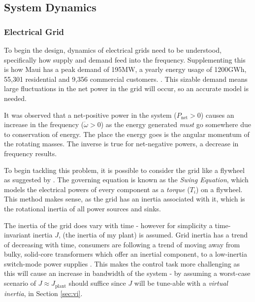 \subsection{System Dynamics}
\label{sec:sysdyn}
\subsubsection{Electrical Grid}

To begin the design, dynamics of electrical grids need to be understood, specifically how supply and demand feed into the frequency.
Supplementing this is how Maui has a {peak demand of 195MW, a yearly energy usage of 1200GWh}, 55,301 residential and 9,356 commercial customers. \cite{power:maui}.
This sizable demand means large fluctuations in the net power in the grid will occur, so an accurate model is needed.

It was observed that a net-positive power in the system ($P_{\text{net}} > 0$) causes an increase in the frequency ($\dot \omega > 0$) as the energy generated \emph{must} go somewhere due to conservation of energy.
The place the energy goes is the angular momentum of the rotating masses.
The inverse is true for net-negative powers, a decrease in frequency results.

To begin tackling this problem, it is possible to consider the grid like a flywheel as suggested by \cite{power:swing}.
The governing equation is known as the \emph{Swing Equation}, which models the electrical powers of every component as a \emph{torque} ($T_i$) on a flywheel.
This method makes sense, as the grid has an inertia associated with it, which is the rotational inertia of all power sources and sinks.

The inertia of the grid does vary with time - however for simplicity a time-invariant inertia $J$, (the inertia of my plant) is assumed.
Grid inertia has a trend of decreasing with time, consumers are following a trend of moving away from bulky, solid-core transformers which offer an inertial component, to a low-inertia switch-mode power supplies \cite{power:vi}.
This makes the control task more challenging as this will cause an increase in bandwidth of the system - by assuming a worst-case scenario of $J \approx J_{\text{plant}}$ should suffice since $J$ will be tune-able with a \emph{virtual inertia}, in Section \ref{sec:vi}.

